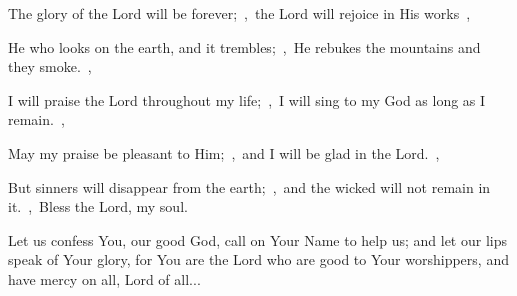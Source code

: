 \documentclass[12pt,twoside,a5paper]{article}
\newcommand{\slota}[1]{\liturgicalhint{Slota.} #1}
\begin{document}
\begin{normalparskip}
  The glory of the Lord will be forever;~\sep\ the Lord will rejoice in His works~\sep

  He who looks on the earth, and it trembles;~\sep\ He rebukes the mountains and they smoke.~\sep

  I will praise the Lord throughout my life;~\sep\ I will sing to my God as long as I remain.~\sep

  May my praise be pleasant to Him;~\sep\ and I will be glad in the Lord.~\sep

  But sinners will disappear from the earth;~\sep\ and the wicked will not remain in it.~\sep\ Bless the Lord, my soul.
\end{normalparskip}

\slota{Let us confess You, our good God, call on Your Name to help us; and let our lips speak of Your glory, for You are the Lord who are good to Your worshippers, and have mercy on all, Lord of all...}
\end{document}
